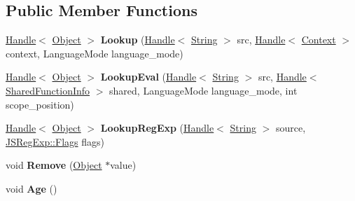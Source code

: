\subsection*{Public Member Functions}
\begin{DoxyCompactItemize}
\item 
\hyperlink{classv8_1_1internal_1_1_handle}{Handle}$<$ \hyperlink{classv8_1_1internal_1_1_object}{Object} $>$ {\bfseries Lookup} (\hyperlink{classv8_1_1internal_1_1_handle}{Handle}$<$ \hyperlink{classv8_1_1internal_1_1_string}{String} $>$ src, \hyperlink{classv8_1_1internal_1_1_handle}{Handle}$<$ \hyperlink{classv8_1_1internal_1_1_context}{Context} $>$ context, Language\+Mode language\+\_\+mode)\hypertarget{classv8_1_1internal_1_1_compilation_cache_table_a2d9579da6f83c3678589f69c3e3646e3}{}\label{classv8_1_1internal_1_1_compilation_cache_table_a2d9579da6f83c3678589f69c3e3646e3}

\item 
\hyperlink{classv8_1_1internal_1_1_handle}{Handle}$<$ \hyperlink{classv8_1_1internal_1_1_object}{Object} $>$ {\bfseries Lookup\+Eval} (\hyperlink{classv8_1_1internal_1_1_handle}{Handle}$<$ \hyperlink{classv8_1_1internal_1_1_string}{String} $>$ src, \hyperlink{classv8_1_1internal_1_1_handle}{Handle}$<$ \hyperlink{classv8_1_1internal_1_1_shared_function_info}{Shared\+Function\+Info} $>$ shared, Language\+Mode language\+\_\+mode, int scope\+\_\+position)\hypertarget{classv8_1_1internal_1_1_compilation_cache_table_a67788559311a86762f8ac8a913883961}{}\label{classv8_1_1internal_1_1_compilation_cache_table_a67788559311a86762f8ac8a913883961}

\item 
\hyperlink{classv8_1_1internal_1_1_handle}{Handle}$<$ \hyperlink{classv8_1_1internal_1_1_object}{Object} $>$ {\bfseries Lookup\+Reg\+Exp} (\hyperlink{classv8_1_1internal_1_1_handle}{Handle}$<$ \hyperlink{classv8_1_1internal_1_1_string}{String} $>$ source, \hyperlink{classv8_1_1base_1_1_flags}{J\+S\+Reg\+Exp\+::\+Flags} flags)\hypertarget{classv8_1_1internal_1_1_compilation_cache_table_a3cddd5ab9d8f79df18a17a244da11904}{}\label{classv8_1_1internal_1_1_compilation_cache_table_a3cddd5ab9d8f79df18a17a244da11904}

\item 
void {\bfseries Remove} (\hyperlink{classv8_1_1internal_1_1_object}{Object} $\ast$value)\hypertarget{classv8_1_1internal_1_1_compilation_cache_table_aaa1a061ec7d89c45fe7901eedb7d8e4c}{}\label{classv8_1_1internal_1_1_compilation_cache_table_aaa1a061ec7d89c45fe7901eedb7d8e4c}

\item 
void {\bfseries Age} ()\hypertarget{classv8_1_1internal_1_1_compilation_cache_table_aa0b4746b24afe324bbe1450553a75506}{}\label{classv8_1_1internal_1_1_compilation_cache_table_aa0b4746b24afe324bbe1450553a75506}

\end{DoxyCompactItemize}
